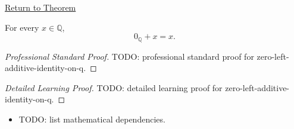 \newpage
{}
\label{prf:zero-left-additive-identity-on-q}

\begin{remark*}[Return]
\hyperref[thm:zero-left-additive-identity-on-q]{Return to Theorem}
\end{remark*}

\begin{theorem*}
For every $x\in\mathbb{Q}$,
\[
0_{\mathbb{Q}}+x=x.
\]
\end{theorem*}

\begin{proof}[Professional Standard Proof]
\LRAProofBodyStart
TODO: professional standard proof for zero-left-additive-identity-on-q.
\end{proof}

\begin{proof}[Detailed Learning Proof]
\LRAProofBodyStart
TODO: detailed learning proof for zero-left-additive-identity-on-q.
\end{proof}

\begin{remark*}
\end{remark*}

\begin{dependencies}
\begin{itemize}
  \item TODO: list mathematical dependencies.
\end{itemize}
\end{dependencies}

\clearpage
